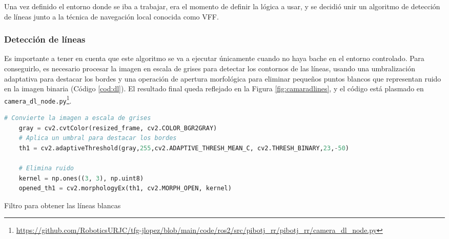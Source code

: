 
Una vez definido el entorno donde se iba a trabajar, era el momento de definir la lógica a usar, y se decidió unir un algoritmo de detección de líneas junto a la técnica de navegación local conocida como \ac{VFF}. 

\subsubsection{Detección de líneas}
\label{subsubsec:softwaredl}

Es importante a tener en cuenta que este algoritmo se va a ejecutar únicamente cuando no haya bache en el entorno controlado. Para conseguirlo, es necesario procesar la imagen en escala de grises para detectar los contornos de las líneas, usando una umbralización adaptativa para destacar los bordes y una operación de apertura morfológica para eliminar pequeños puntos blancos que representan ruido en la imagen binaria (Código \ref{cod:dl}). El resultado final queda reflejado en la Figura \ref{fig:camaradlines}, y el código está plasmado en \verb|camera_dl_node.py|\footnote{\url{https://github.com/RoboticsURJC/tfg-jlopez/blob/main/code/ros2/src/pibotj_rr/pibotj_rr/camera_dl_node.py}}.


\begin{code}[h]
	\begin{lstlisting}[language=Python]
	# Convierte la imagen a escala de grises
	gray = cv2.cvtColor(resized_frame, cv2.COLOR_BGR2GRAY)
	# Aplica un umbral para destacar los bordes
	th1 = cv2.adaptiveThreshold(gray,255,cv2.ADAPTIVE_THRESH_MEAN_C, cv2.THRESH_BINARY,23,-50)
		
	# Elimina ruido
	kernel = np.ones((3, 3), np.uint8) 
	opened_th1 = cv2.morphologyEx(th1, cv2.MORPH_OPEN, kernel)
	\end{lstlisting}
	\caption[Filtro para obtener las líneas blancas]{Filtro para obtener las líneas blancas}
	\label{cod:dl}
\end{code}


